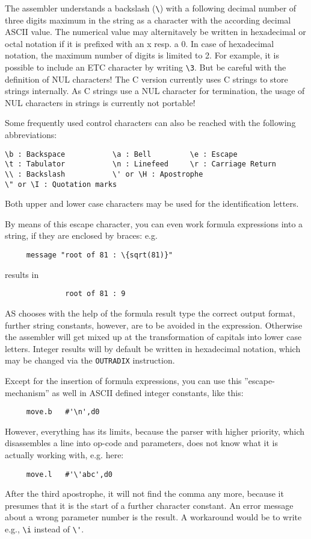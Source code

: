 \documentclass[12pt,twoside]{report}
\newcommand{\tty}[1]{{\tt #1}}
\begin{document}
The assembler understands a backslash (\verb!\!) with a following decimal
number of three digits maximum in the string as a character with the
according decimal ASCII value.  The numerical value may alternitavely be
written in hexadecimal or octal notation if it is prefixed with an x resp.
a 0.  In case of hexadecimal notation, the maximum number of digits is
limited to 2.  For example, it is possible to include an ETC character by
writing {\tt\verb!\!3}.  But be careful with the definition of NUL
characters!  The C  version currently uses C strings
to store strings internally.  As C strings use a NUL character for
termination, the usage of NUL characters in strings is currently not
portable!

Some frequently used control characters can also be reached with the
following abbreviations:
\begin{verbatim}
\b : Backspace           \a : Bell         \e : Escape
\t : Tabulator           \n : Linefeed     \r : Carriage Return
\\ : Backslash           \' or \H : Apostrophe 
\" or \I : Quotation marks
\end{verbatim}
Both upper and lower case characters may be used for the
identification letters.

By means of this escape character, you can even work formula
expressions into a string, if they are enclosed by braces: e.g.
\begin{verbatim}
     message "root of 81 : \{sqrt(81)}"
\end{verbatim}
results in
\begin{verbatim}
              root of 81 : 9
\end{verbatim}
AS chooses with the help of the formula result type the correct
output format, further string constants, however, are to be avoided
in the expression.  Otherwise the assembler will get mixed up at the
transformation of capitals into lower case letters.  Integer results will
by default be written in hexadecimal notation, which may be changed via
the \tty{OUTRADIX} instruction.

Except for the insertion of formula expressions, you can use this 
''escape-mechanism'' as well in ASCII defined integer constants, 
like this:
\begin{verbatim}
     move.b   #'\n',d0
\end{verbatim}
However, everything has its limits, because the parser with higher 
priority, which disassembles a line into op-code and parameters, does 
not know what it is actually working with, e.g. here:
\begin{verbatim}
     move.l   #'\'abc',d0
\end{verbatim}
After the third apostrophe, it will not find the comma any more, 
because it presumes that it is the start of a further character 
constant. An error message about a wrong parameter number is the result.  
A workaround would be to write e.g., \verb!\i! instead of \verb!\'!.
\end{document}

